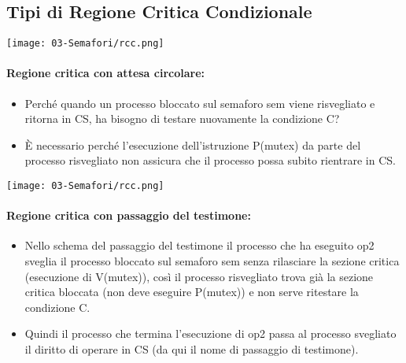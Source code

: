 \subsection{Tipi di Regione Critica Condizionale}

\begin{center}
	\texttt{[image: 03-Semafori/rcc.png]}
\end{center}

\paragraph{Regione critica con attesa circolare:}

\begin{itemize}
	\item Perché quando un processo bloccato sul semaforo
	      sem viene risvegliato e ritorna in CS, ha bisogno di
	      testare nuovamente la condizione C?
	\item È necessario perché l’esecuzione dell’istruzione
	      P(mutex) da parte del processo risvegliato non
	      assicura che il processo possa subito rientrare in CS.
\end{itemize}

\begin{center}
	\texttt{[image: 03-Semafori/rcc.png]}
\end{center}

\paragraph{Regione critica con passaggio del testimone:}

\begin{itemize}
	\item Nello schema del passaggio del testimone il processo che ha
	      eseguito op2 sveglia il processo bloccato sul semaforo sem senza
	      rilasciare la sezione critica (esecuzione di V(mutex)), così il processo
	      risvegliato trova già la sezione critica bloccata (non deve eseguire
	      P(mutex)) e non serve ritestare la condizione C.
	\item Quindi il processo che termina l’esecuzione di op2 passa al processo
	      svegliato il diritto di operare in CS (da qui il nome di passaggio di
	      testimone).

\end{itemize}


